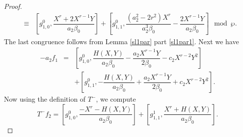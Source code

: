 \documentclass[10pt,a4paper]{amsart}
\begin{document}
\begin{proof}
\begin{eqnarray}
   &\equiv& \left[g_{1,0}^{0},\dfrac{X^{r}+ 2X^{r-1}Y}{a_{2}\beta_{0}}\right]+ \left[g_{1,1}^{0}, \dfrac{(a_{2}^2-2r^2)X^{r}}{a_{2}^3\beta_{0}} - \dfrac{2X^{r-1}Y}{a_{2}\beta_{0}}   \right]   \mod \wp.
    \end{eqnarray}
The last congruence follows from Lemma \ref{sl1par} part \eqref{sl1par1}. 
Next we have
\begin{eqnarray}\label{F2'a2f1}
    -a_{2}f_{1} &=& \left[g_{1,0}^{0}, \dfrac{H(X,Y)}{a_{2}\beta_{0}}-\dfrac{a_{2}X^{r-1}Y}{2\beta_{0}} -c_{2}X^{r-2}Y^{2}\right] \nonumber\\
    &&+ \left[g_{1,1}^{0},-\dfrac{H(X,Y)}{a_{2}\beta_{0}}+\dfrac{a_{2}X^{r-1}Y}{2\beta_{0}} +c_{2}X^{r-2}Y^{2}\right]. 
\end{eqnarray}
Now using the definition of $T^-$, we compute
\begin{equation}\label{F2'T-f2}
    T^{-}f_{2} = \left[g_{1,0}^{0}, \dfrac{-X^{r}-H(X,Y)}{a_{2}\beta_{0}}\right] + \left[g_{1,1}^{1}, \dfrac{X^{r}+H(X,Y)}{a_{2}\beta_{0}}\right].
\end{equation}


\end{proof}
\end{document}
